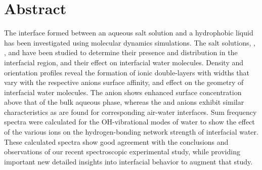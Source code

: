 \section{Abstract}


The interface formed between an aqueous salt solution and a hydrophobic liquid has been investigated using molecular dynamics simulations. The salt solutions, \nacl, \sodnit, and \sodsul have been studied to determine their presence and distribution in the interfacial region, and their effect on interfacial water molecules. Density and orientation profiles reveal the formation of ionic double-layers with widths that vary with the respective anions surface affinity, and effect on the geometry of interfacial water molecules. The \nit anion shows enhanced surface concentration above that of the bulk aqueous phase, whereas the \cl and \sul anions exhibit similar characteristics as are found for corresponding air-water interfaces. Sum frequency spectra were calculated for the OH-vibrational modes of water to show the effect of the various ions on the hydrogen-bonding network strength of interfacial water. These calculated spectra show good agreement with the conclusions and observations of our recent spectroscopic experimental study, while providing important new detailed insights into interfacial behavior to augment that study.
